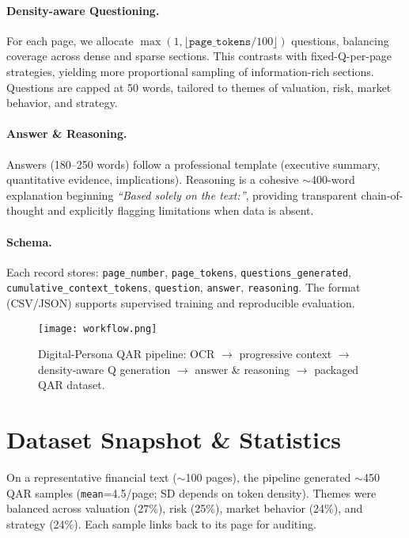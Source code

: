 \documentclass[sigconf,authordraft,anonymous]{acmart}
\begin{document}
\paragraph{Density-aware Questioning.}
For each page, we allocate $\max(1, \lfloor \texttt{page\_tokens}/100 \rfloor)$ questions, balancing coverage across dense and sparse sections. This contrasts with fixed-Q-per-page strategies, yielding more proportional sampling of information-rich sections. Questions are capped at 50 words, tailored to themes of valuation, risk, market behavior, and strategy.

\paragraph{Answer \& Reasoning.}
Answers (180--250 words) follow a professional template (executive summary, quantitative evidence, implications). Reasoning is a cohesive $\sim$400-word explanation beginning \emph{``Based solely on the text:''}, providing transparent chain-of-thought and explicitly flagging limitations when data is absent.

\paragraph{Schema.}
Each record stores: \texttt{page\_number}, \texttt{page\_tokens}, \texttt{questions\_generated}, \texttt{cumulative\_context\_tokens}, \texttt{question}, \texttt{answer}, \texttt{reasoning}. The format (CSV/JSON) supports supervised training and reproducible evaluation.

\begin{figure}[t]
  \centering
  \texttt{[image: workflow.png]}
  \caption{Digital-Persona QAR pipeline: OCR $\rightarrow$ progressive context $\rightarrow$ density-aware Q generation $\rightarrow$ answer \& reasoning $\rightarrow$ packaged QAR dataset.}
  \label{fig:workflow}
\end{figure}

\section{Dataset Snapshot \& Statistics}
On a representative financial text ($\sim$100 pages), the pipeline generated $\sim$450 QAR samples (\texttt{mean}=4.5/page; SD depends on token density). Themes were balanced across valuation (27\%), risk (25\%), market behavior (24\%), and strategy (24\%). Each sample links back to its page for auditing.
\end{document}
